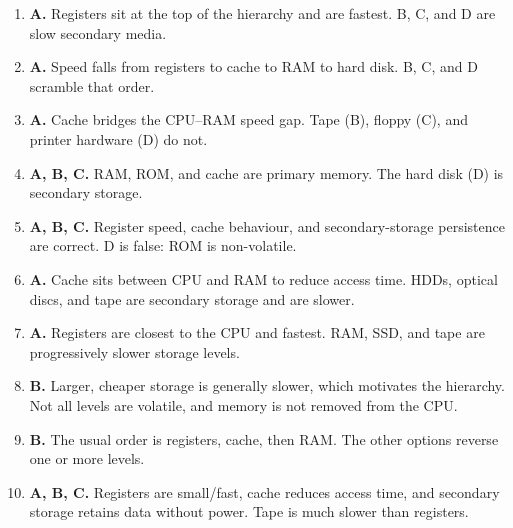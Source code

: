 \begin{enumerate}[label=\textbf{Q\arabic*.}, leftmargin=*]
\item \textbf{A.} Registers sit at the top of the hierarchy and are fastest. B, C, and D are slow secondary media.
\item \textbf{A.} Speed falls from registers to cache to RAM to hard disk. B, C, and D scramble that order.
\item \textbf{A.} Cache bridges the CPU--RAM speed gap. Tape (B), floppy (C), and printer hardware (D) do not.
\item \textbf{A, B, C.} RAM, ROM, and cache are primary memory. The hard disk (D) is secondary storage.
\item \textbf{A, B, C.} Register speed, cache behaviour, and secondary-storage persistence are correct. D is false: ROM is non-volatile.
\item \textbf{A.} Cache sits between CPU and RAM to reduce access time. HDDs, optical discs, and tape are secondary storage and are slower.

\item \textbf{A.} Registers are closest to the CPU and fastest. RAM, SSD, and tape are progressively slower storage levels.

\item \textbf{B.} Larger, cheaper storage is generally slower, which motivates the hierarchy. Not all levels are volatile, and memory is not removed from the CPU.

\item \textbf{B.} The usual order is registers, cache, then RAM. The other options reverse one or more levels.

\item \textbf{A, B, C.} Registers are small/fast, cache reduces access time, and secondary storage retains data without power. Tape is much slower than registers.

\end{enumerate}
